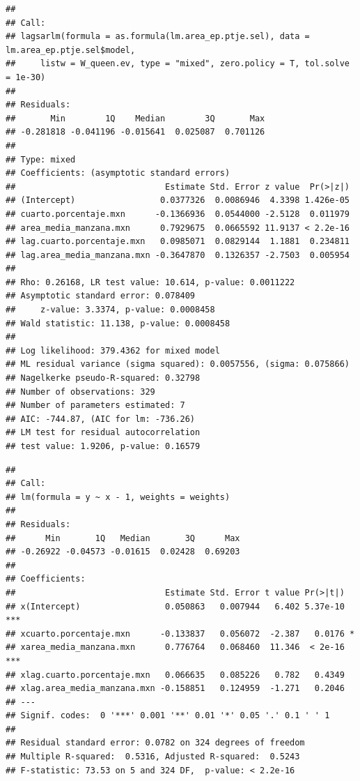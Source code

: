 \documentclass[12pt,]{book}
\newenvironment{Shaded}{\begin{snugshade}}{\end{snugshade}}
\newcommand{\KeywordTok}[1]{\textcolor[rgb]{0.13,0.29,0.53}{\textbf{#1}}}
\newcommand{\DataTypeTok}[1]{\textcolor[rgb]{0.13,0.29,0.53}{#1}}
\newcommand{\CommentTok}[1]{\textcolor[rgb]{0.56,0.35,0.01}{\textit{#1}}}
\newcommand{\OperatorTok}[1]{\textcolor[rgb]{0.81,0.36,0.00}{\textbf{#1}}}
\newcommand{\NormalTok}[1]{#1}
\begin{document}
\begin{verbatim}
## 
## Call:
## lagsarlm(formula = as.formula(lm.area_ep.ptje.sel), data = lm.area_ep.ptje.sel$model, 
##     listw = W_queen.ev, type = "mixed", zero.policy = T, tol.solve = 1e-30)
## 
## Residuals:
##       Min        1Q    Median        3Q       Max 
## -0.281818 -0.041196 -0.015641  0.025087  0.701126 
## 
## Type: mixed 
## Coefficients: (asymptotic standard errors) 
##                              Estimate Std. Error z value  Pr(>|z|)
## (Intercept)                 0.0377326  0.0086946  4.3398 1.426e-05
## cuarto.porcentaje.mxn      -0.1366936  0.0544000 -2.5128  0.011979
## area_media_manzana.mxn      0.7929675  0.0665592 11.9137 < 2.2e-16
## lag.cuarto.porcentaje.mxn   0.0985071  0.0829144  1.1881  0.234811
## lag.area_media_manzana.mxn -0.3647870  0.1326357 -2.7503  0.005954
## 
## Rho: 0.26168, LR test value: 10.614, p-value: 0.0011222
## Asymptotic standard error: 0.078409
##     z-value: 3.3374, p-value: 0.0008458
## Wald statistic: 11.138, p-value: 0.0008458
## 
## Log likelihood: 379.4362 for mixed model
## ML residual variance (sigma squared): 0.0057556, (sigma: 0.075866)
## Nagelkerke pseudo-R-squared: 0.32798 
## Number of observations: 329 
## Number of parameters estimated: 7 
## AIC: -744.87, (AIC for lm: -736.26)
## LM test for residual autocorrelation
## test value: 1.9206, p-value: 0.16579
\end{verbatim}

\begin{Shaded}
\end{Shaded}

\begin{verbatim}
## 
## Call:
## lm(formula = y ~ x - 1, weights = weights)
## 
## Residuals:
##      Min       1Q   Median       3Q      Max 
## -0.26922 -0.04573 -0.01615  0.02428  0.69203 
## 
## Coefficients:
##                              Estimate Std. Error t value Pr(>|t|)    
## x(Intercept)                 0.050863   0.007944   6.402 5.37e-10 ***
## xcuarto.porcentaje.mxn      -0.133837   0.056072  -2.387   0.0176 *  
## xarea_media_manzana.mxn      0.776764   0.068460  11.346  < 2e-16 ***
## xlag.cuarto.porcentaje.mxn   0.066635   0.085226   0.782   0.4349    
## xlag.area_media_manzana.mxn -0.158851   0.124959  -1.271   0.2046    
## ---
## Signif. codes:  0 '***' 0.001 '**' 0.01 '*' 0.05 '.' 0.1 ' ' 1
## 
## Residual standard error: 0.0782 on 324 degrees of freedom
## Multiple R-squared:  0.5316, Adjusted R-squared:  0.5243 
## F-statistic: 73.53 on 5 and 324 DF,  p-value: < 2.2e-16
\end{verbatim}
\end{document}
